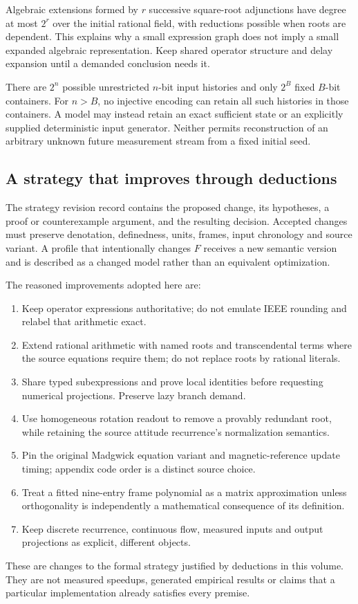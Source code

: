 Algebraic extensions formed by $r$ successive square-root adjunctions have
degree at most $2^r$ over the initial rational field, with reductions possible
when roots are dependent. This explains why a small expression graph does not
imply a small expanded algebraic representation. Keep shared operator structure
and delay expansion until a demanded conclusion needs it.

There are $2^n$ possible unrestricted $n$-bit input histories and only $2^B$
fixed $B$-bit containers. For $n>B$, no injective encoding can retain all such
histories in those containers. A model may instead retain an exact sufficient
state or an explicitly supplied deterministic input generator. Neither permits
reconstruction of an arbitrary unknown future measurement stream from a fixed
initial seed.

\subsection{A strategy that improves through deductions}
The strategy revision record contains the proposed change, its hypotheses, a
proof or counterexample argument, and the resulting decision. Accepted changes
must preserve denotation, definedness, units, frames, input chronology and source
variant. A profile that intentionally changes $F$ receives a new semantic version
and is described as a changed model rather than an equivalent optimization.

The reasoned improvements adopted here are:
\begin{enumerate}
\item Keep operator expressions authoritative; do not emulate IEEE rounding and
      relabel that arithmetic exact.
\item Extend rational arithmetic with named roots and transcendental terms where
      the source equations require them; do not replace roots by rational literals.
\item Share typed subexpressions and prove local identities before requesting
      numerical projections. Preserve lazy branch demand.
\item Use homogeneous rotation readout to remove a provably redundant root, while
      retaining the source attitude recurrence's normalization semantics.
\item Pin the original Madgwick equation variant and magnetic-reference update
      timing; appendix code order is a distinct source choice.
\item Treat a fitted nine-entry frame polynomial as a matrix approximation unless
      orthogonality is independently a mathematical consequence of its definition.
\item Keep discrete recurrence, continuous flow, measured inputs and output
      projections as explicit, different objects.
\end{enumerate}
These are changes to the formal strategy justified by deductions in this volume.
They are not measured speedups, generated empirical results or claims that a
particular implementation already satisfies every premise.


